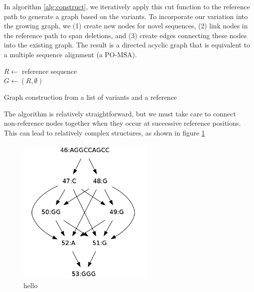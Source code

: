 \documentclass{article}
\begin{document}
In algorithm \ref{alg:construct}, we iteratively apply this cut function to the reference path to generate a graph based on the variants. To incorporate our variation into the growing graph, we (1) create new nodes for novel sequences, (2) link nodes in the reference path to span deletions, and (3) create edges connecting these nodes into the existing graph. The result is a directed acyclic graph that is equivalent to a multiple sequence alignment (a PO-MSA).

\begin{algorithm}[h!]
  $R \gets $ reference sequence \\
  $G \gets ( R, \emptyset )$ \\
  \caption{
\label{alg:construct}
Graph construction from a list of variants and a reference}
\end{algorithm}

The algorithm is relatively straightforward, but we must take care to connect non-reference nodes together when they occur at successive reference positions. This can lead to relatively complex structures, as shown in figure \ref{fig:complexjunction}

\begin{figure}[h!]
\centering
\includegraphics[width=0.6\textwidth]{figures/complexjunction}
\caption{\label{fig:complexjunction}
hello
}
\end{figure}
\end{document}
